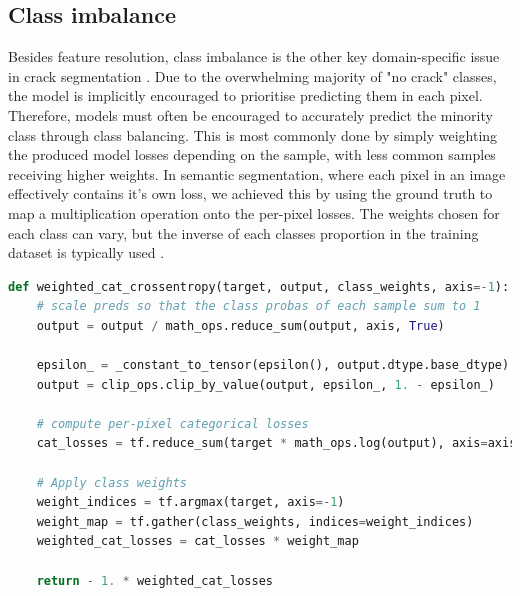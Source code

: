 \documentclass[a4paper,12pt]{report}
\begin{document}
\subsection{Class imbalance}
Besides feature resolution, class imbalance is the other key domain-specific issue in crack segmentation \cite{hamishebahar_comprehensive_2022}. Due to the overwhelming majority of "no crack" classes, the model is implicitly encouraged to prioritise predicting them in each pixel. Therefore, models must often be encouraged to accurately predict the minority class through class balancing. This is most commonly done by simply weighting the produced model losses depending on the sample, with less common samples receiving higher weights. In semantic segmentation, where each pixel in an image effectively contains it's own loss, we achieved this by using the ground truth to map a multiplication operation onto the per-pixel losses. The weights chosen for each class can vary, but the inverse of each classes proportion in the training dataset is typically used \cite{kochkarev_data_2020}.

\hspace*{4mm}
\begin{lstlisting}[language=Python, caption=Weighted categorical crossentropy function in python using TensorFlow 2.1]
def weighted_cat_crossentropy(target, output, class_weights, axis=-1):
    # scale preds so that the class probas of each sample sum to 1
    output = output / math_ops.reduce_sum(output, axis, True)

    epsilon_ = _constant_to_tensor(epsilon(), output.dtype.base_dtype)
    output = clip_ops.clip_by_value(output, epsilon_, 1. - epsilon_)

    # compute per-pixel categorical losses
    cat_losses = tf.reduce_sum(target * math_ops.log(output), axis=axis)
    
    # Apply class weights
    weight_indices = tf.argmax(target, axis=-1)
    weight_map = tf.gather(class_weights, indices=weight_indices)
    weighted_cat_losses = cat_losses * weight_map
    
    return - 1. * weighted_cat_losses
\end{lstlisting}
\end{document}
